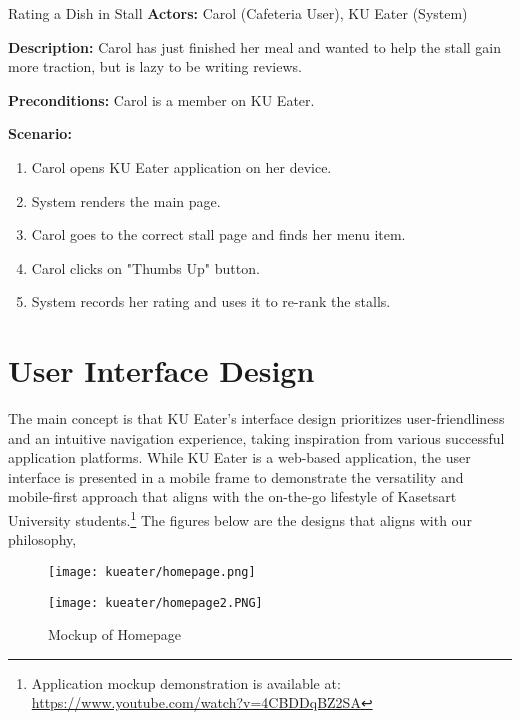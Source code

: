 \begin{usecase}{Rating a Dish in Stall}
    \textbf{Actors:} Carol (Cafeteria User), KU Eater (System)

    \textbf{Description:} Carol has just finished her meal and wanted to help the stall gain more traction, but is lazy to be writing reviews.

    \textbf{Preconditions:} Carol is a member on KU Eater.

    \textbf{Scenario:}

    \begin{enumerate}[leftmargin=80pt]
        \item Carol opens KU Eater application on her device.
        \item System renders the main page.
        \item Carol goes to the correct stall page and finds her menu item.
        \item Carol clicks on "Thumbs Up" button.
        \item System records her rating and uses it to re-rank the stalls.
    \end{enumerate}
\end{usecase}


\newpage

\section{User Interface Design}
\label{section:user-interface-design}

The main concept is that KU Eater's interface design prioritizes user-friendliness and an intuitive navigation experience,
taking inspiration from various successful application platforms. While KU Eater is a web-based application,
the user interface is presented in a mobile frame to demonstrate the versatility and mobile-first approach that aligns with
the on-the-go lifestyle of Kasetsart University students.\footnote{Application mockup demonstration is available at: \url{https://www.youtube.com/watch?v=4CBDDqBZ2SA}}
The figures below are the designs that aligns with our philosophy,


\begin{figure}[h!]
    \begin{minipage}{.5\textwidth}
        \centering
        \texttt{[image: kueater/homepage.png]}
    \end{minipage}%
    \begin{minipage}{.5\textwidth}
        \centering
        \texttt{[image: kueater/homepage2.PNG]}
    \end{minipage}
    \caption{Mockup of Homepage}
    \vspace*{-\baselineskip}
\end{figure}

